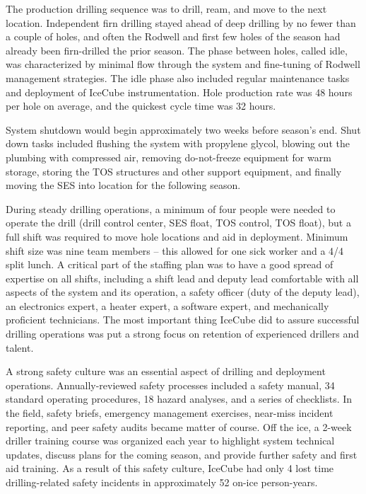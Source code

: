 The production drilling sequence was to drill, ream, and move to the next location.  Independent firn drilling stayed ahead of deep drilling by no fewer than a couple of holes, and often the Rodwell and first few holes of the season had already been firn-drilled the prior season.  The phase between holes, called idle, was characterized by minimal flow through the system and fine-tuning of Rodwell management strategies.  The idle phase also included regular maintenance tasks and deployment of IceCube instrumentation.  Hole production rate was 48 hours per hole on average, and the quickest cycle time was 32 hours.

System shutdown would begin approximately two weeks before season’s end.  Shut down tasks included flushing the system with propylene glycol, blowing out the plumbing with compressed air, removing do-not-freeze equipment for warm storage, storing the TOS structures and other support equipment, and finally moving the SES into location for the following season.

During steady drilling operations, a minimum of four people were needed to operate the drill (drill control center, SES float, TOS control, TOS float), but a full shift was required to move hole locations and aid in deployment.  Minimum shift size was nine team members – this allowed for one sick worker and a 4/4 split lunch.  A critical part of the staffing plan was to have a good spread of expertise on all shifts, including a shift lead and deputy lead comfortable with all aspects of the system and its operation, a safety officer (duty of the deputy lead), an electronics expert, a heater expert, a software expert, and mechanically proficient technicians.  The most important thing IceCube did to assure successful drilling operations was put a strong focus on retention of experienced drillers and talent.

A strong safety culture was an essential aspect of drilling and deployment operations.  Annually-reviewed safety processes included a safety manual, 34 standard operating procedures, 18 hazard analyses, and a series of checklists.  In the field, safety briefs, emergency management exercises, near-miss incident reporting, and peer safety audits became matter of course.  Off the ice, a 2-week driller training course was organized each year to highlight system technical updates, discuss plans for the coming season, and provide further safety and first aid training.  As a result of this safety culture, IceCube had only 4 lost time drilling-related safety incidents in approximately 52 on-ice person-years.

